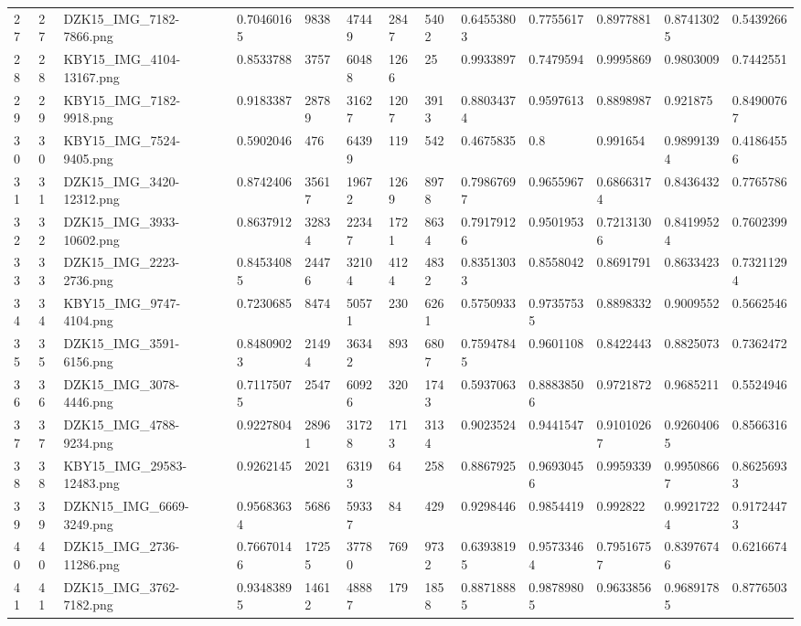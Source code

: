 \documentclass[11pt, a4paper, twoside]{report}
\begin{document}
\begin{longtable}[c]{@{}lllllllllllll@{}}
27 & 27 & DZK15\_IMG\_7182-7866.png & 0.70460165 & 9838 & 47449 & 2847 & 5402 & 0.64553803 & 0.7755617 & 0.8977881 & 0.87413025 & 0.5439266 \\
28 & 28 & KBY15\_IMG\_4104-13167.png & 0.8533788 & 3757 & 60488 & 1266 & 25 & 0.9933897 & 0.7479594 & 0.9995869 & 0.9803009 & 0.7442551 \\
29 & 29 & KBY15\_IMG\_7182-9918.png & 0.9183387 & 28789 & 31627 & 1207 & 3913 & 0.88034374 & 0.9597613 & 0.8898987 & 0.921875 & 0.84900767 \\
30 & 30 & KBY15\_IMG\_7524-9405.png & 0.5902046 & 476 & 64399 & 119 & 542 & 0.4675835 & 0.8 & 0.991654 & 0.98991394 & 0.41864556 \\
31 & 31 & DZK15\_IMG\_3420-12312.png & 0.8742406 & 35617 & 19672 & 1269 & 8978 & 0.79867697 & 0.9655967 & 0.68663174 & 0.8436432 & 0.7765786 \\
32 & 32 & DZK15\_IMG\_3933-10602.png & 0.8637912 & 32834 & 22347 & 1721 & 8634 & 0.79179126 & 0.9501953 & 0.72131306 & 0.84199524 & 0.7602399 \\
33 & 33 & DZK15\_IMG\_2223-2736.png & 0.84534085 & 24476 & 32104 & 4124 & 4832 & 0.83513033 & 0.8558042 & 0.8691791 & 0.8633423 & 0.73211294 \\
34 & 34 & KBY15\_IMG\_9747-4104.png & 0.7230685 & 8474 & 50571 & 230 & 6261 & 0.5750933 & 0.97357535 & 0.8898332 & 0.9009552 & 0.5662546 \\
35 & 35 & DZK15\_IMG\_3591-6156.png & 0.84809023 & 21494 & 36342 & 893 & 6807 & 0.75947845 & 0.9601108 & 0.8422443 & 0.8825073 & 0.7362472 \\
36 & 36 & DZK15\_IMG\_3078-4446.png & 0.71175075 & 2547 & 60926 & 320 & 1743 & 0.5937063 & 0.88838506 & 0.9721872 & 0.9685211 & 0.5524946 \\
37 & 37 & DZK15\_IMG\_4788-9234.png & 0.9227804 & 28961 & 31728 & 1713 & 3134 & 0.9023524 & 0.9441547 & 0.91010267 & 0.92604065 & 0.8566316 \\
38 & 38 & KBY15\_IMG\_29583-12483.png & 0.9262145 & 2021 & 63193 & 64 & 258 & 0.8867925 & 0.96930456 & 0.9959339 & 0.99508667 & 0.86256933 \\
39 & 39 & DZKN15\_IMG\_6669-3249.png & 0.95683634 & 5686 & 59337 & 84 & 429 & 0.9298446 & 0.9854419 & 0.992822 & 0.99217224 & 0.91724473 \\
40 & 40 & DZK15\_IMG\_2736-11286.png & 0.76670146 & 17255 & 37780 & 769 & 9732 & 0.63938195 & 0.95733464 & 0.79516757 & 0.83976746 & 0.6216674 \\
41 & 41 & DZK15\_IMG\_3762-7182.png & 0.93483895 & 14612 & 48887 & 179 & 1858 & 0.88718885 & 0.98789805 & 0.9633856 & 0.96891785 & 0.8776503 \\

\end{longtable}
\end{document}
